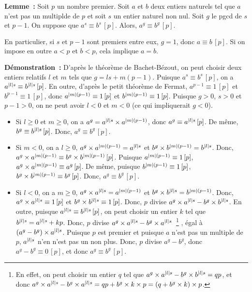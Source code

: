 \medskip

\noindent\textbf{Lemme :} Soit $p$ un nombre premier. 
    Soit $a$ et $b$ deux entiers naturels tel que $a$ n'est pas un multiplde de $p$ et soit $s$ un entier naturel non nul.
    Soit $g$ le pgcd de $s$ et $p-1$.
    On suppose que $a^s \equiv b^s \, [p]$.
    Alors, $a^g \equiv b^g \, [p]$.
    
    \noindent En particulier, si $s$ et $p-1$ sont premiers entre eux, $g = 1$, donc $a \equiv b \, [p]$.
    Si on impose en outre $a < p$ et $b < p$, cela implique $a = b$.

\medskip

\noindent\textbf{Démonstration :} 
D'après le théorème de Bachet-Bézout, on peut choisir deux entiers relatifs $l$ et $m$ tels que $g = l s + m (p-1)$. 
Puisque $a^s \equiv b^s \, [p]$, on a $a^{\left\lvert l \right\rvert s} \equiv b^{\left\lvert l \right\rvert s} \, [p]$.
En outre, d'après le petit théorème de Fermat, $a^{p-1} \equiv 1 \, [p]$ et $b^{p-1} \equiv 1 \, [p]$, donc $a^{\left\lvert m \right\rvert (p-1)} \equiv 1 \, [p]$ et $b^{\left\lvert m \right\rvert (p-1)} \equiv 1 \, [p]$.
Puisque $g > 0$, $s > 0$ et $p-1 > 0$, on ne peut avoir $l < 0$ et $m < 0$ (ce qui impliquerait $g < 0$).

\begin{itemize}[nosep]
    \item Si $l \geq 0$ et $m \geq 0$, on a $a^g = a^{\left\lvert l \right\rvert s} \times a^{\left\lvert m \right\rvert (p-1)}$, donc $a^g \equiv a^{\left\lvert l \right\rvert s} \, [p]$.
        De même, $b^g \equiv b^{\left\lvert l \right\rvert s} \, [p]$.
        Donc, $a^g \equiv b^g \, [p]$.
    \item Si $m < 0$, on a $l \geq 0$, $a^g \times a^{\left\lvert m \right\rvert (p-1)} = a^{\left\lvert l \right\rvert s}$ et $b^g \times b^{\left\lvert m \right\rvert (p-1)} = b^{\left\lvert l \right\rvert s}$.
        Donc, $a^g \times a^{\left\lvert m \right\rvert (p-1)} \equiv b^g \times b^{\left\lvert m \right\rvert (p-1)} \, [p]$. 
        Puisque $a^{\left\lvert m \right\rvert (p-1)} \equiv 1 \, [p]$, $a^g \times a^{\left\lvert m \right\rvert (p-1)} \equiv a^g \, [p]$.
        De même, puisque $b^{\left\lvert m \right\rvert (p-1)} \equiv 1 \, [p]$, $b^g \times b^{\left\lvert m \right\rvert (p-1)} \equiv b^g \, [p]$.
        Donc, $a^g \equiv b^g \, [p]$.
    \item Si $l < 0$, on a $m \geq 0$, $a^g \times a^{\left\lvert l \right\rvert s} = a^{\left\lvert m \right\rvert (p-1)}$ et $b^g \times b^{\left\lvert l \right\rvert s} = b^{\left\lvert m \right\rvert (p-1)}$.
        Donc, $a^g \times a^{\left\lvert l \right\rvert s} \equiv 1 \, [p]$ et $b^g \times b^{\left\lvert l \right\rvert s} \equiv 1 \, [p]$. 
        Donc, $p$ divise $a^g \times a^{\left\lvert l \right\rvert s} - b^g \times b^{\left\lvert l \right\rvert s}$. 
        En outre, puisque $a^{\left\lvert l \right\rvert s} \equiv b^{\left\lvert l \right\rvert s} \, [p]$, on peut choisir un entier $k$ tel que $b^{\left\lvert l \right\rvert s} = a^{\left\lvert l \right\rvert s} + k p$.
        Donc, $p$ divise $a^g \times a^{\left\lvert l \right\rvert s} - b^g \times a^{\left\lvert l \right\rvert s}$~\footnote{
            En effet, on peut choisir un entier $q$ tel que $a^g \times a^{\left\lvert l \right\rvert s} - b^g \times b^{\left\lvert l \right\rvert s} = q p$, et donc $a^g \times a^{\left\lvert l \right\rvert s} - b^g \times a^{\left\lvert l \right\rvert s} = q p + b^g \times k \times p = (q + b^g \times k) \times p$.
        }%
        , égal à $(a^g - b^g) \times a^{\left\lvert l \right\rvert s}$. 
        Puisque $p$ est premier et puisque $a$ n'est pas un multiple de $p$, $a^{\left\lvert l \right\rvert s}$ n'en n'est pas un non plus.
        Donc, $p$ divise $a^g - b^g$, donc $a^g - b^g \equiv 0 \, [p]$, et donc $a^g \equiv b^g \, [p]$.
\end{itemize}

